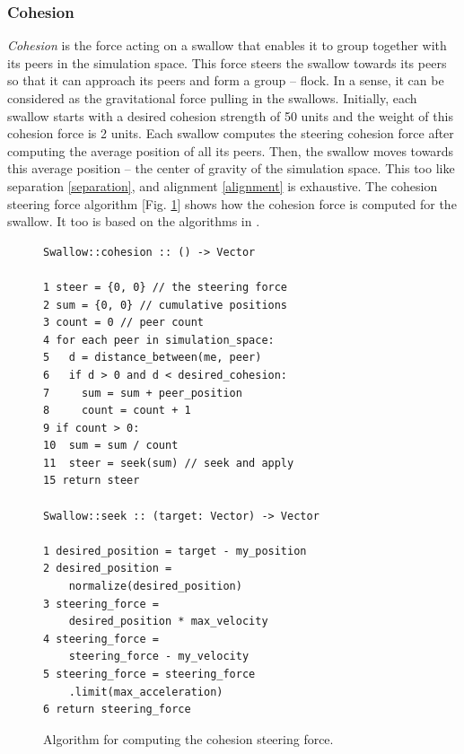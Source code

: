 \documentclass[../main]{subfiles}
\begin{document}
\subsubsection{Cohesion}
\label{cohesion}

{\em Cohesion} is the force acting on a swallow that enables it to group together with its peers in the simulation space. This force steers the swallow towards its peers so that it can approach its peers and form a group -- flock.
In a sense, it can be considered as the gravitational force pulling in the swallows. Initially, each swallow starts with a desired cohesion strength of 50 units and the weight of this cohesion force is 2 units. Each swallow computes the steering cohesion force after computing the average position of all its peers. Then, the swallow moves towards this average position -- the center of gravity of the simulation space. This too like separation \ref{separation}, and alignment \ref{alignment} is exhaustive. The cohesion steering force algorithm [Fig. \ref{cohesionLogic}] shows how the cohesion force is computed for the swallow. It too is based on the algorithms in \cite{reynolds1999steering, danshiffman}.

\begin{figure}
	\begin{verbatim}
Swallow::cohesion :: () -> Vector

1 steer = {0, 0} // the steering force
2 sum = {0, 0} // cumulative positions
3 count = 0 // peer count
4 for each peer in simulation_space:
5   d = distance_between(me, peer)
6   if d > 0 and d < desired_cohesion:
7     sum = sum + peer_position
8     count = count + 1
9 if count > 0:
10  sum = sum / count
11  steer = seek(sum) // seek and apply
15 return steer

Swallow::seek :: (target: Vector) -> Vector

1 desired_position = target - my_position
2 desired_position = 
    normalize(desired_position)
3 steering_force = 
    desired_position * max_velocity
4 steering_force = 
    steering_force - my_velocity
5 steering_force = steering_force
    .limit(max_acceleration)
6 return steering_force
    \end{verbatim}
	\caption{Algorithm for computing the cohesion steering force.}
	\label{cohesionLogic}
\end{figure}
\end{document}

